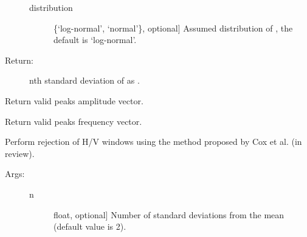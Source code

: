 \documentclass[letterpaper,10pt,english,openany,oneside]{sphinxmanual}
\begin{document}
\begin{fulllineitems}
\begin{fulllineitems}
\begin{description}
\begin{description}
\item[{distribution}] \leavevmode{[}\{‘log-normal’, ‘normal’\}, optional{]}
Assumed distribution of , the default is
‘log-normal’.

\end{description}

\item[{Return:}] \leavevmode
nth standard deviation of  as .

\end{description}

\end{fulllineitems}


\begin{fulllineitems}
\label{\detokenize{index:hvsrpy.Hvsr.peak_amp}}
Return valid peaks amplitude vector.

\end{fulllineitems}


\begin{fulllineitems}
\label{\detokenize{index:hvsrpy.Hvsr.peak_frq}}
Return valid peaks frequency vector.

\end{fulllineitems}


\begin{fulllineitems}
\label{\detokenize{index:hvsrpy.Hvsr.reject_windows}}
Perform rejection of H/V windows using the method proposed by
Cox et al. (in review).
\begin{description}
\item[{Args:}] \leavevmode\begin{description}
\item[{n}] \leavevmode{[}float, optional{]}
Number of standard deviations from the mean (default
value is 2).


\end{description}
\end{description}
\end{fulllineitems}
\end{fulllineitems}
\end{document}
